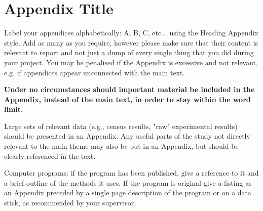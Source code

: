 \documentclass[a4paper,12pt]{article}
\begin{document}
\clearpage


\appendix

\section{Appendix Title}
\label{sec:appendix}

Label your appendices alphabetically: A, B, C, etc... using the Heading Appendix style. Add as many as you require, however please make sure that their content is relevant to report and not just a dump of every single thing that you did during your project. You may be penalised if the Appendix is excessive and not relevant, e.g. if appendices appear unconnected with the main text.

\textbf{Under no circumstances should important material be included in the Appendix, instead of the
  main text, in order to stay within the word limit.}

Large sets of relevant data (e.g., census results, "raw" experimental results) should be presented in an Appendix. Any useful parts of the study not directly relevant to the main theme may also be put in an Appendix, but should be clearly referenced in the text. 

Computer programs: if the program has been published, give a reference to it and a brief outline of the methods it uses. If the program is original give a listing as an Appendix preceded by a single page description of the program or on a data stick, as recommended by your supervisor.
\end{document}
